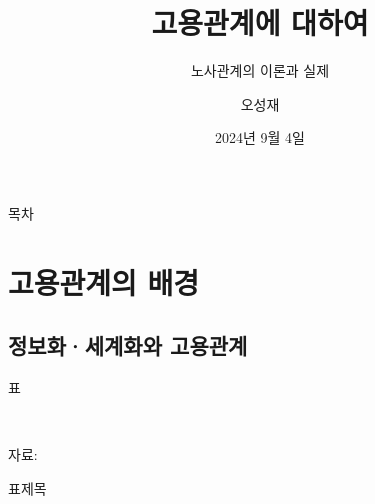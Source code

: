 \documentclass[aspectratio=169,xcolor=dvipsnames,presentation]{beamer}
\title[]{고용관계에 대하여} %
\subtitle{노사관계의 이론과 실제}
\author[]{오성재}
\institute[CNU] %
{
    충남대학교 경제학과\\
}
\date{2024년 9월 4일} %
\begin{document}
\begin{frame}
    \titlepage
\end{frame}

\begin{frame}{목차}
    \tableofcontents[hideallsubsections]
\end{frame}

\section{고용관계의 배경}

\subsection{정보화·세계화와 고용관계}

\begin{frame}{표}
    \scriptsize
    \begin{table}
        \centering
        \resizebox{.6\textwidth}{!}{
            
        }
        \\
        \raggedright %
        \hspace{1em} %
        \tiny{자료:} %
        \caption{표제목}
    \end{table}
\end{frame}
\end{document}

